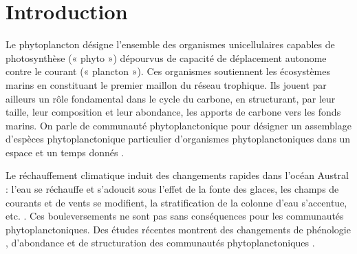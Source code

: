 \documentclass[11pt,a4paper,oneside]{report}
\begin{document}
\begin{abstract}
		
		\vspace{0.3cm}
		
		\textbf{Conclusion et perspectives.} Ces résultats suggèrent que la structuration environnementale (physico-chimique et hydrodynamique) prédomine sur la seule composition pigmentaire dans l'explication de la distribution des NTI, sur la période et l'échelle considérées. Ils soulignent également la nécessité d'une évaluation méthodologiquement rigoureuse dans les modèles écologiques spatio-temporels. Des travaux futurs pourraient intégrer un décalage temporel entre efflorescence phytoplanctonique et réponse des NTI, intégrer explicitement la non-stationnarité, exploiter des données de bio-logging pour élargir la couverture spatio-temporelle, et recourir à des modèles additifs généralisés (GAM) et aux valeurs SHAP pour préciser le sens des relations identifiées.
		
		\vspace{0.5cm}
		\noindent\textbf{Mots-clés :} océan Austral, niveaux trophiques intermédiaires, acoustique active, phytoplancton, arbres de régression, validation croisée spatio-temporelle
	\end{abstract}
	
	\clearpage
	\tableofcontents
	
	\clearpage
	\chapter{Introduction}
	
	Le phytoplancton désigne l'ensemble des organismes unicellulaires capables de photosynthèse (« phyto ») dépourvus de capacité de déplacement autonome contre le courant (« plancton »). Ces organismes soutiennent les écosystèmes marins en constituant le premier maillon du réseau trophique. Ils jouent par ailleurs un rôle fondamental dans le cycle du carbone, en structurant, par leur taille, leur composition et leur abondance, les apports de carbone vers les fonds marins. On parle de communauté phytoplanctonique pour désigner un assemblage d'espèces phytoplanctonique particulier d'organismes phytoplanctoniques dans un espace et un temps donnés \cite{reynolds2006ecology}.
	
	\vspace{0.3cm}
	
	Le réchauffement climatique induit des changements rapides dans l'océan Austral : l'eau se réchauffe et s'adoucit sous l'effet de la fonte des glaces, les champs de courants et de vents se modifient, la stratification de la colonne d'eau s'accentue, etc. \cite{sallee2018}. Ces bouleversements ne sont pas sans conséquences pour les communautés phytoplanctoniques. Des études récentes \cite{abram2025Antarctic} montrent des changements de phénologie \cite{thomalla2023Widespread}\cite{boyce2017environmental}, d'abondance \cite{hayward2024Antarctic} et de structuration des communautés phytoplanctoniques \cite{adroli2026}.
	
\end{document}
